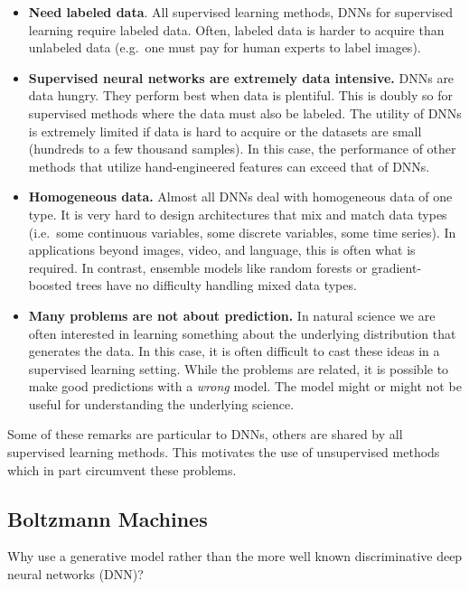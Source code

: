 \documentclass[%
oneside,                 %
final,                   %
10pt]{article}
\begin{document}
\begin{itemize}
\item \textbf{Need labeled data}. All supervised learning methods, DNNs for supervised learning require labeled data. Often, labeled data is harder to acquire than unlabeled data (e.g.~one must pay for human experts to label images).

\item \textbf{Supervised neural networks are extremely data intensive.} DNNs are data hungry. They perform best when data is plentiful. This is doubly so for supervised methods where the data must also be labeled. The utility of DNNs is extremely limited if data is hard to acquire or the datasets are small (hundreds to a few thousand samples). In this case, the performance of other methods that utilize hand-engineered features can exceed that of DNNs.

\item \textbf{Homogeneous data.} Almost all DNNs deal with homogeneous data of one type. It is very hard to design architectures that mix and match data types (i.e.~some continuous variables, some discrete variables, some time series). In applications beyond images, video, and language, this is often what is required. In contrast, ensemble models like random forests or gradient-boosted trees have no difficulty handling mixed data types.

\item \textbf{Many problems are not about prediction.} In natural science we are often interested in learning something about the underlying distribution that generates the data. In this case, it is often difficult to cast these ideas in a supervised learning setting. While the problems are related, it is possible to make good predictions with a \emph{wrong} model. The model might or might not be useful for understanding the underlying science.
\end{itemize}

\noindent
Some of these remarks are particular to DNNs, others are shared by all supervised learning methods. This motivates the use of unsupervised methods which in part circumvent these problems.






\subsection{Boltzmann Machines}

Why use a generative model rather than the more well known discriminative deep neural networks (DNN)? 
\end{document}
